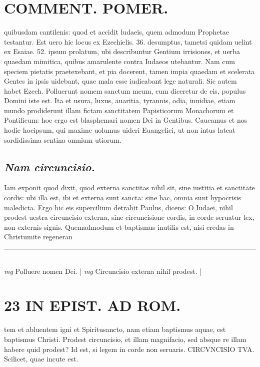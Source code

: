 \documentclass{article}
\begin{document}
\begin{pages}
\section*{COMMENT. POMER.  }\pstart quibusdam cantilenis: quod et accidit ludaeis, quem admodum Prophetae testantur. Est uero hic locus ex Ezechielis. 36. desumptus, tametsi quidam uelint ex Esaiae. 52. ipsum prolatum, ubi describuntur Gentium irrisiones, et uerba quaedam mimitica, quibus amarulente contra Iudaeos utebantur. Nam cum speciem pietatis praetexebant, et pia docerent, tamen impia quaedam et scelerata Gentes in ipsis uidebant, quae mala esse iudicabant lege naturali. Sic autem habet Ezech. Polluerunt nomem sanctum meum, cum diceretur de eis, populus Domini iste est. Ita et usura, luxus, auaritia, tyrannis, odia, inuidiae, etiam mundo prodiderunt illam fictam sanctitatem Papisticorum Monachorum et Pontificum: hoc ergo est blasphemari nomen Dei in Gentibus. Caueamus et nos hodie hocipsum, qui maxime uolumus uideri Euangelici, ut non intus lateat sordidissima sentina omnium utiorum.   \pend
{}
{}
\subsection*{\textit{Nam circuncisio. }}\pstart Iam exponit quod dixit, quod externa sanctitas nihil sit, sine iustitia et sanctitate cordis: ubi illa est, ibi et externa sunt sancta: sine hac, omnia sunt hypocrisis maledicta. Ergo hic eis supercilium detrahit Paulus, dicens: O Iudaei, nihil prodest uestra circuncisio externa, sine circuncisione cordis, in corde seruatur lex, non externis signis. Quemadmodum et baptismus inutilis est, nisi credas in Christumite regeneran  \pend
\vspace{0.5cm}\noindent
\vspace{0.2cm}\rule{1cm}{0.2pt}\\ 
\hspace{0.2cm}\textit{mg}
\footnotesize Polluere nomen Dei. 
\normalsize| 
\hspace{0.2cm}\textit{mg}
\footnotesize Circuncisio externa nihil prodest.  
\normalsize| 
\section*{23 IN EPIST. AD ROM.  }
\marginpar{[ p.]}\pstart tem et abluentem igni et Spiritusancto, nam etiam baptismus aquae, est baptismus Christi. Prodest circuncisio, et illam magnifacio, sed absque re illam habere quid prodest?  \pend\pstart Id est, si legem in corde non seruaris. CIRCVNCISIO TVA. Scilicet, quae incute est.   \pend
{}
{}

\end{pages}
\end{document}
